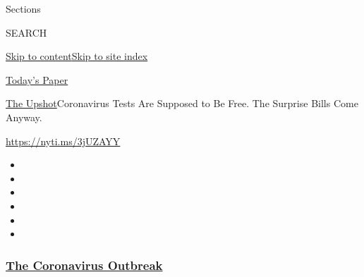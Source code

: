 Sections

SEARCH

\protect\hyperlink{site-content}{Skip to
content}\protect\hyperlink{site-index}{Skip to site index}

\href{https://myaccount.nytimes3xbfgragh.onion/auth/login?response_type=cookie\&client_id=vi}{}

\href{https://www.nytimes3xbfgragh.onion/section/todayspaper}{Today's
Paper}

\href{/section/upshot}{The Upshot}\textbar{}Coronavirus Tests Are
Supposed to Be Free. The Surprise Bills Come Anyway.

\url{https://nyti.ms/3jUZAYY}

\begin{itemize}
\item
\item
\item
\item
\item
\item
\end{itemize}

\hypertarget{the-coronavirus-outbreak}{%
\subsubsection{\texorpdfstring{\href{https://www.nytimes3xbfgragh.onion/news-event/coronavirus?name=styln-coronavirus-national\&region=TOP_BANNER\&block=storyline_menu_recirc\&action=click\&pgtype=Article\&impression_id=819d6b70-f2a3-11ea-8800-53e543aa1720\&variant=undefined}{The
Coronavirus
Outbreak}}{The Coronavirus Outbreak}}\label{the-coronavirus-outbreak}}

